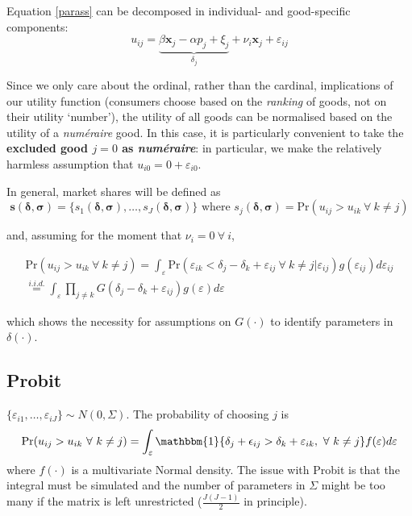 \documentclass[11pt]{article}
\begin{document}
Equation \eqref{parass} can be decomposed in individual- and good-specific components:
\begin{equation}
	\label{mui}
	u_{ij} = \underbrace{\beta\mathbf{x}_j - \alpha p_j + \xi_j}_{\delta_j} + \nu_i\mathbf{x}_j + \varepsilon_{ij}
\end{equation}

Since we only care about the ordinal, rather than the cardinal, implications of our utility function (consumers choose based on the \textit{ranking} of goods, not on their utility `number'), the utility of all goods can be normalised based on the utility of a \textit{num\'{e}raire} good.
In this case, it is particularly convenient to take the \textbf{excluded good $j = 0$ as \textit{num\'{e}raire}}: in particular, we make the relatively harmless assumption that $u_{i0} = 0 + \varepsilon_{i0}$.

In general, market shares will be defined as
\begin{equation}
	\bm{s(\delta, \sigma)} = \{s_1(\bm{\delta, \sigma}), \dots, s_J(\bm{\delta, \sigma})\} \text{ where }
	s_j(\bm{\delta, \sigma}) = \text{Pr}(u_{ij} > u_{ik} ~\forall~ k \neq j)
\end{equation}

and, assuming for the moment that $\nu_i = 0 ~\forall~ i$,

\begin{equation}
	\begin{gathered}
	\label{pr_G}
	\text{Pr}(u_{ij} > u_{ik} ~\forall~ k \neq j) = \int_\varepsilon \text{Pr}(\varepsilon_{ik} < \delta_{j} - \delta_k + \varepsilon_{ij} ~\forall~ k \neq j | \varepsilon_{ij}) g(\varepsilon_{ij}) d\varepsilon_{ij} \\
	\overset{i.i.d.}{=} \int_{\varepsilon} \prod_{j \neq k} G(\delta_{j} - \delta_k + \varepsilon_{ij}) g(\varepsilon) d\varepsilon
	\end{gathered}
\end{equation}

which shows the necessity for assumptions on $G(\cdot)$ to identify parameters in $\delta(\cdot)$.

\subsection{Probit}

$\{\varepsilon_{i1}, \dots, \varepsilon_{iJ}\} \sim N(0, \Sigma)$. The probability of choosing $j$ is
\begin{equation}
	\text{Pr}(u_{ij} > u_{ik} ~\forall~ k \neq j) = \int_\varepsilon \mathbbm{1}\{ \delta_j + \epsilon_{ij} > \delta_k + \varepsilon_{ik}, ~\forall~ k \neq j \} f(\varepsilon) d \varepsilon
\end{equation}
where $f(\cdot)$ is a multivariate Normal density. The issue with Probit is that the integral must be simulated and the number of parameters in $\Sigma$ might be too many if the matrix is left unrestricted ($\frac{J(J-1)}{2}$ in principle).
\end{document}
